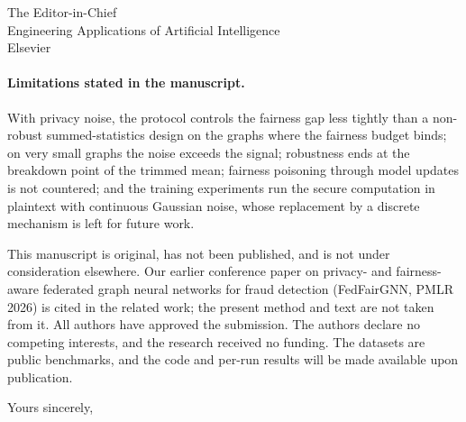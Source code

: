\documentclass[11pt]{letter}
\begin{document}
\begin{letter}{The Editor-in-Chief\\Engineering Applications of Artificial Intelligence\\Elsevier}
\paragraph{Limitations stated in the manuscript.} With privacy noise, the protocol controls the fairness gap less tightly than a non-robust summed-statistics design on the graphs where the fairness budget binds; on very small graphs the noise exceeds the signal; robustness ends at the breakdown point of the trimmed mean; fairness poisoning through model updates is not countered; and the training experiments run the secure computation in plaintext with continuous Gaussian noise, whose replacement by a discrete mechanism is left for future work.

This manuscript is original, has not been published, and is not under consideration elsewhere. Our earlier conference paper on privacy- and fairness-aware federated graph neural networks for fraud detection (FedFairGNN, PMLR 2026) is cited in the related work; the present method and text are not taken from it. All authors have approved the submission. The authors declare no competing interests, and the research received no funding. The datasets are public benchmarks, and the code and per-run results will be made available upon publication.

\closing{Yours sincerely,}

\end{letter}
\end{document}
